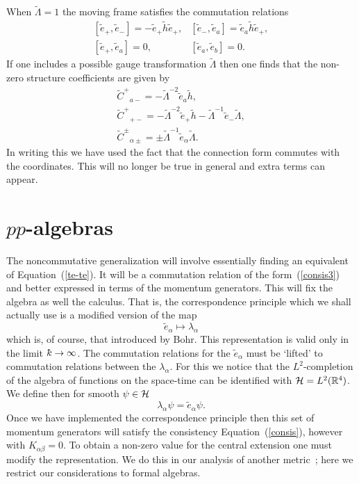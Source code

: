 \documentclass[12pt,a4paper]{article}
\newcounter{eg}
\def\t#1{\tilde #1}
\def\b#1{{\mathbb #1}}
\def\c#1{{\cal #1}}
\def\kbar{{\mathchar'26\mkern-9muk}}
\newcommand{\initiate}{\setcounter{equation}{0}}
\begin{document}
When $\tilde{\Lambda}=1$ the moving frame satisfies the commutation
relations
$$
\begin{array}{ll}
[\t{e}_+, \t{e}_-] = - \t{e}_+ \t{h} \t{e}_+, &
[\t{e}_-, \t{e}_a] = \t{e}_a \t{h} \t{e}_+, \\[4pt]
[\t{e}_+, \t{e}_a] = 0, &
[\t{e}_a, \t{e}_b] = 0.
\end{array}
$$
If one includes a possible gauge transformation $\t{\Lambda}$ then one
finds that the non-zero structure coefficients are given by
\begin{equation}
\begin{array}{l}
\t{C}^+{}_{a -} = -\t{\Lambda}^{-2}\t{e}_a \t{h},\\[4pt]
\t{C}^+{}_{+ -} = -\t{\Lambda}^{-2}\t{e}_+ \t{h}
- \t{\Lambda}^{-1}\t{e}_-\t{\Lambda}          ,\\[4pt]
\t{C}^\pm{}_{\alpha \pm} = \pm\t{\Lambda}^{-1}\t{e}_\alpha\t{\Lambda}.
                                                                \label{Cclas} 
\end{array}
\end{equation}
In writing this we have used the fact that the connection form
commutes with the coordinates. This will no longer be true in general
and extra terms can appear.


\initiate
\section{$pp$-algebras}

The noncommutative generalization will involve essentially finding an
equivalent of Equation~(\ref{te-te}). It will be a commutation
relation of the form~(\ref{consis3}) and better expressed in terms of
the momentum generators. This will fix the algebra as well the
calculus. That is, the correspondence principle which we shall
actually use is a modified version of the map
$$
\t{e}_\alpha \mapsto \lambda_\alpha
$$
which is, of course, that introduced by Bohr.  This representation
is valid only in the limit $\kbar \to \infty$.  The commutation
relations for the $\t{e}_\alpha$ must be `lifted' to commutation
relations between the $\lambda_\alpha$. For this we notice that the
$L^2$-completion of the algebra of functions on the space-time can be
identified with $\c{H} = L^2(\b{R}^4)$. We define then for smooth
$\psi \in \c{H}$
\begin{equation}
\lambda_\alpha \psi = \t{e}_\alpha \psi.                 \label{repres}
\end{equation}
Once we have implemented the correspondence principle then this set of
momentum generators will satisfy the consistency
Equation~(\ref{consis}), however with $K_{\alpha\beta} = 0$. To obtain a
non-zero value for the central extension one must modify the
representation. We do this in our analysis of another
metric~\cite{MacMadZou02}; here we restrict our considerations to formal
algebras. 
\end{document}
